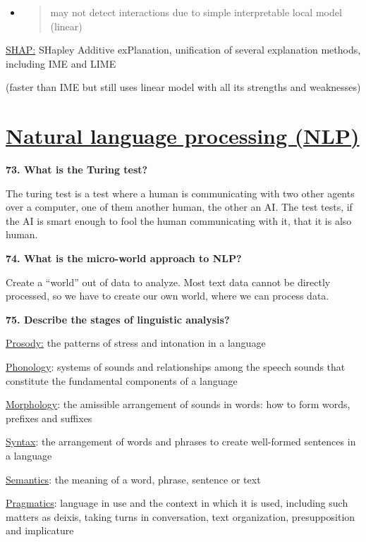 \begin{itemize}
\item
  \begin{quote}
  may not detect interactions due to simple interpretable local model
  (linear)
  \end{quote}
\end{itemize}

\underline{SHAP:} SHapley Additive exPlanation, unification of several
explanation methods, including IME and LIME

(faster than IME but still uses linear model with all its strengths and
weaknesses)

\hypertarget{natural-language-processing-nlp}{%
\section{\texorpdfstring{\underline{Natural language processing
(NLP)}}{Natural language processing (NLP)}}\label{natural-language-processing-nlp}}

\textbf{73. What is the Turing test?}

The turing test is a test where a human is communicating with two other
agents over a computer, one of them another human, the other an AI. The
test tests, if the AI is smart enough to fool the human communicating
with it, that it is also human.

\textbf{74. What is the micro-world approach to NLP?}

Create a ``world'' out of data to analyze. Most text data cannot be
directly processed, so we have to create our own world, where we can
process data.

\textbf{75. Describe the stages of linguistic analysis?}

\underline{Prosody:} the patterns of stress and intonation in a language

\underline{Phonology}: systems of sounds and relationships among the
speech sounds that constitute the fundamental components of a language

\underline{Morphology}: the amissible arrangement of sounds in words:
how to form words, prefixes and suffixes

\underline{Syntax}: the arrangement of words and phrases to create
well-formed sentences in a language

\underline{Semantics}: the meaning of a word, phrase, sentence or text

\underline{Pragmatics}: language in use and the context in which it is
used, including such matters as deixis, taking turns in conversation,
text organization, presupposition and implicature

